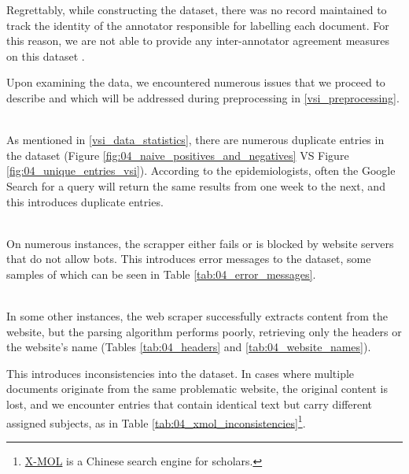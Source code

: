 \begin{tcolorbox}[colback=mylightblue,colframe=gray!50!black]
Regrettably, while constructing the dataset, there was no record maintained to track the identity of the annotator responsible for labelling each document. For this reason, we are not able to provide any inter-annotator agreement measures on this dataset .
\end{tcolorbox}

\label{vsi_data_issues}


Upon examining the data, we encountered numerous issues that we proceed to describe and which will be addressed during preprocessing in \headerName{} \ref{vsi_preprocessing}.


\label{vsi_issues_duplicates}
\ \\

As mentioned in \headerName{} \ref{vsi_data_statistics}, there are numerous duplicate entries in the dataset (Figure \ref{fig:04_naive_positives_and_negatives} VS Figure \ref{fig:04_unique_entries_vsi}). According to the epidemiologists, often the Google Search for a query will return the same results from one week to the next, and this introduces duplicate entries.
 


\label{vsi_issues_error_messages}
\ \\

On numerous instances, the \trafilatura{} scrapper either fails or is blocked by website servers that do not allow bots. This introduces error messages to the dataset, some samples of which can be seen in Table \ref{tab:04_error_messages}.





\label{vsi_issues_scrapping_errors}
\ \\

In some other instances, the web scraper successfully extracts content from the website, but the parsing algorithm performs poorly, retrieving only the headers or the website's name (Tables \ref{tab:04_headers} and \ref{tab:04_website_names}).




This introduces inconsistencies into the \VSI{} dataset. In cases where multiple documents originate from the same problematic website, the original content is lost, and we encounter entries that contain identical text but carry different assigned subjects, as in Table \ref{tab:04_xmol_inconsistencies}\footnote{\href{https://www.x-mol.com/}{X-MOL} is a Chinese search engine for scholars.}.




